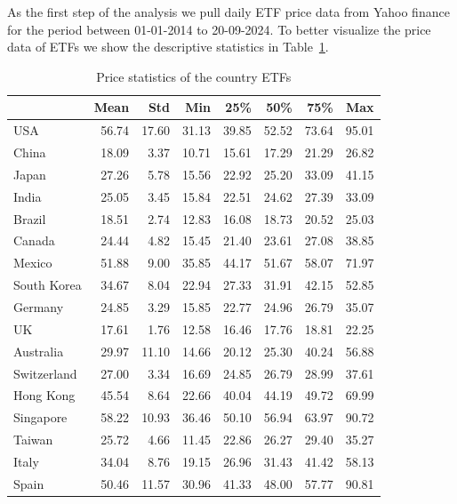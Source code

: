 \documentclass[a4paper,12pt,twoside]{article}
\begin{document}
As the first step of the analysis we pull daily ETF price data from Yahoo finance for the period between 01-01-2014 to 20-09-2024.  To better visualize the price data of ETFs we show the descriptive statistics in Table~\ref{tab:summary_stats_price}.

\begin{table}[h!]
\centering
\begin{tabular}{lrrrrrrr}
\hline
\textbf{} & \textbf{Mean} & \textbf{Std} & \textbf{Min} & \textbf{25\%} & \textbf{50\%} & \textbf{75\%} & \textbf{Max} \\
\hline
USA         &  56.74 &  17.60 & 31.13 & 39.85 & 52.52 & 73.64 & 95.01 \\
China       &  18.09 &   3.37 & 10.71 & 15.61 & 17.29 & 21.29 & 26.82 \\
Japan       &  27.26 &   5.78 & 15.56 & 22.92 & 25.20 & 33.09 & 41.15 \\
India       &  25.05 &   3.45 & 15.84 & 22.51 & 24.62 & 27.39 & 33.09 \\
Brazil      &  18.51 &   2.74 & 12.83 & 16.08 & 18.73 & 20.52 & 25.03 \\
Canada      &  24.44 &   4.82 & 15.45 & 21.40 & 23.61 & 27.08 & 38.85 \\
Mexico      &  51.88 &   9.00 & 35.85 & 44.17 & 51.67 & 58.07 & 71.97 \\
South Korea &  34.67 &   8.04 & 22.94 & 27.33 & 31.91 & 42.15 & 52.85 \\
Germany     &  24.85 &   3.29 & 15.85 & 22.77 & 24.96 & 26.79 & 35.07 \\
UK          &  17.61 &   1.76 & 12.58 & 16.46 & 17.76 & 18.81 & 22.25 \\
Australia   &  29.97 &  11.10 & 14.66 & 20.12 & 25.30 & 40.24 & 56.88 \\
Switzerland &  27.00 &   3.34 & 16.69 & 24.85 & 26.79 & 28.99 & 37.61 \\
Hong Kong   &  45.54 &   8.64 & 22.66 & 40.04 & 44.19 & 49.72 & 69.99 \\
Singapore   &  58.22 &  10.93 & 36.46 & 50.10 & 56.94 & 63.97 & 90.72 \\
Taiwan      &  25.72 &   4.66 & 11.45 & 22.86 & 26.27 & 29.40 & 35.27 \\
Italy       &  34.04 &   8.76 & 19.15 & 26.96 & 31.43 & 41.42 & 58.13 \\
Spain       &  50.46 &  11.57 & 30.96 & 41.33 & 48.00 & 57.77 & 90.81 \\
\hline
\end{tabular}
\caption{Price statistics of the country ETFs}
\label{tab:summary_stats_price}
\end{table}
\end{document}
